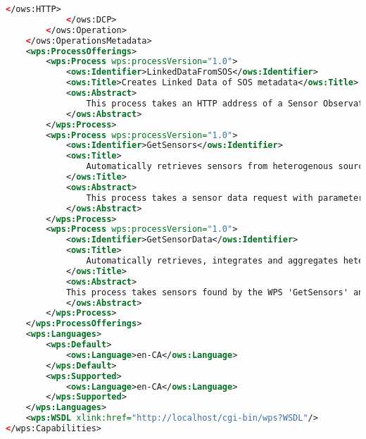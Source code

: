 \begin{lstlisting}[language=xml]
				</ows:HTTP>
			</ows:DCP>
		</ows:Operation>
	</ows:OperationsMetadata>
	<wps:ProcessOfferings>
		<wps:Process wps:processVersion="1.0">
			<ows:Identifier>LinkedDataFromSOS</ows:Identifier>
			<ows:Title>Creates Linked Data of SOS metadata</ows:Title>
			<ows:Abstract>
				This process takes an HTTP address of a Sensor Observation Service (SOS) as input and converts the metadata to linked data.
			</ows:Abstract>
		</wps:Process>
		<wps:Process wps:processVersion="1.0">
			<ows:Identifier>GetSensors</ows:Identifier>
			<ows:Title>
				Automatically retrieves sensors from heterogenous sources using the semantic web
			</ows:Title>
			<ows:Abstract>
				This process takes a sensor data request with parameters for spatial features of interest, observed property, temporal range and granularity, and finds all relevant sensor data sources on the semantic web.
			</ows:Abstract>
		</wps:Process>
		<wps:Process wps:processVersion="1.0">
			<ows:Identifier>GetSensorData</ows:Identifier>
			<ows:Title>
				Automatically retrieves, integrates and aggregates heterogenous sensor data using the semantic web
			</ows:Title>
			<ows:Abstract>
			This process takes sensors found by the WPS 'GetSensors' and automatically integrates and aggregates the data from different sources on the web.
			</ows:Abstract>
		</wps:Process>
	</wps:ProcessOfferings>
	<wps:Languages>
		<wps:Default>
			<ows:Language>en-CA</ows:Language>
		</wps:Default>
		<wps:Supported>
			<ows:Language>en-CA</ows:Language>
		</wps:Supported>
	</wps:Languages>
	<wps:WSDL xlink:href="http://localhost/cgi-bin/wps?WSDL"/>
</wps:Capabilities>
\end{lstlisting}

\clearpage

